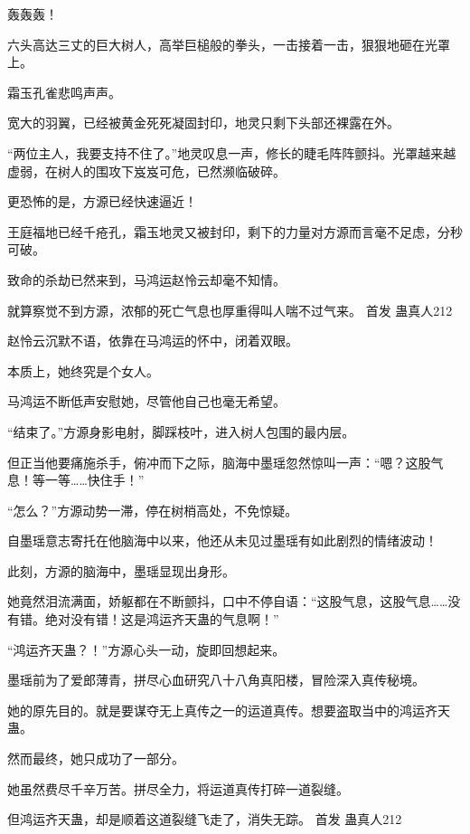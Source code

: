 
\begin{this_body}



轰轰轰！

六头高达三丈的巨大树人，高举巨槌般的拳头，一击接着一击，狠狠地砸在光罩上。

霜玉孔雀悲鸣声声。

宽大的羽翼，已经被黄金死死凝固封印，地灵只剩下头部还裸露在外。

“两位主人，我要支持不住了。”地灵叹息一声，修长的睫毛阵阵颤抖。光罩越来越虚弱，在树人的围攻下岌岌可危，已然濒临破碎。

更恐怖的是，方源已经快速逼近！

王庭福地已经千疮孔，霜玉地灵又被封印，剩下的力量对方源而言毫不足虑，分秒可破。

致命的杀劫已然来到，马鸿运赵怜云却毫不知情。

就算察觉不到方源，浓郁的死亡气息也厚重得叫人喘不过气来。  首发 蛊真人212

赵怜云沉默不语，依靠在马鸿运的怀中，闭着双眼。

本质上，她终究是个女人。

马鸿运不断低声安慰她，尽管他自己也毫无希望。

“结束了。”方源身影电射，脚踩枝叶，进入树人包围的最内层。

但正当他要痛施杀手，俯冲而下之际，脑海中墨瑶忽然惊叫一声：“嗯？这股气息！等一等……快住手！”

“怎么？”方源动势一滞，停在树梢高处，不免惊疑。

自墨瑶意志寄托在他脑海中以来，他还从未见过墨瑶有如此剧烈的情绪波动！

此刻，方源的脑海中，墨瑶显现出身形。

她竟然泪流满面，娇躯都在不断颤抖，口中不停自语：“这股气息，这股气息……没有错。绝对没有错！这是鸿运齐天蛊的气息啊！”

“鸿运齐天蛊？！”方源心头一动，旋即回想起来。

墨瑶前为了爱郎薄青，拼尽心血研究八十八角真阳楼，冒险深入真传秘境。

她的原先目的。就是要谋夺无上真传之一的运道真传。想要盗取当中的鸿运齐天蛊。

然而最终，她只成功了一部分。

她虽然费尽千辛万苦。拼尽全力，将运道真传打碎一道裂缝。

但鸿运齐天蛊，却是顺着这道裂缝飞走了，消失无踪。  首发 蛊真人212


\end{this_body}
